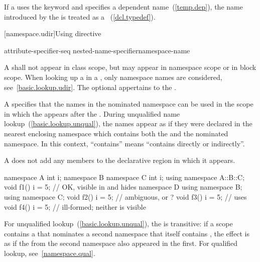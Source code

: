 \pnum
If a  uses the keyword  and
specifies a dependent name~(\ref{temp.dep}), the name introduced by the
 is treated as a
~(\ref{dcl.typedef}).%

[namespace.udir]{Using directive}%

\begin{bnf}
\br
    attribute-specifier-seq\opt{}  nested-name-specifier\opt namespace-name \terminal{;}
\end{bnf}

\pnum
A  shall not appear in class scope, but may
appear in namespace scope or in block scope.
\enternote
When looking up a  in a
, only namespace names are considered,
see~\ref{basic.lookup.udir}.
\exitnote
The optional  appertains to the .

\pnum
A  specifies that the names in the nominated
namespace can be used in the scope in which the
 appears after the .
During unqualified name lookup~(\ref{basic.lookup.unqual}), the names
appear as if they were declared in the nearest enclosing namespace which
contains both the  and the nominated
namespace.
\enternote
In this context, ``contains'' means ``contains directly or indirectly''.
\exitnote

\pnum
A  does not add any members to the declarative
region in which it appears.
\enterexample

\begin{codeblock}
namespace A {
  int i;
  namespace B {
    namespace C {
      int i;
    }
    using namespace A::B::C;
    void f1() {
      i = 5;        // OK,  visible in  and hides 
    }
  }
  namespace D {
    using namespace B;
    using namespace C;
    void f2() {
      i = 5;        // ambiguous,  or ?
    }
  }
  void f3() {
    i = 5;          // uses 
  }
}
void f4() {
  i = 5;            // ill-formed; neither  is visible
}
\end{codeblock}
\exitexample

\pnum
For unqualified lookup~(\ref{basic.lookup.unqual}), the
 is transitive: if a scope contains a
 that nominates a second namespace that itself
contains , the effect is as if the
 from the second namespace also appeared in
the first.
\enternote For qualified lookup, see~\ref{namespace.qual}. \exitnote
\enterexample

